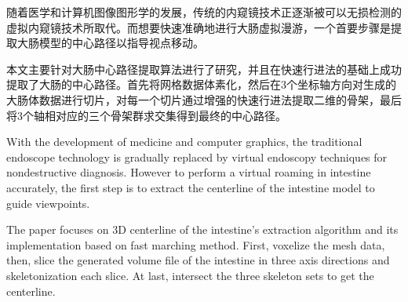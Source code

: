 \begin{cabstract}
随着医学和计算机图像图形学的发展，传统的内窥镜技术正逐渐被可以无损检测的虚拟内窥镜技术所取代。而想要快速准确地进行大肠虚拟漫游，一个首要步骤是提取大肠模型的中心路径以指导视点移动。

本文主要针对大肠中心路径提取算法进行了研究，并且在快速行进法的基础上成功提取了大肠的中心路径。首先将网格数据体素化，然后在3个坐标轴方向对生成的大肠体数据进行切片，对每一个切片通过增强的快速行进法提取二维的骨架，最后将3个轴相对应的三个骨架群求交集得到最终的中心路径。
\end{cabstract}

\begin{eabstract}
With the development of medicine and computer graphics, the traditional endoscope technology is gradually replaced by virtual endoscopy techniques for nondestructive diagnosis. However to perform a virtual roaming in intestine accurately, the first step is to extract the centerline of the intestine model to guide viewpoints.

The paper focuses on 3D centerline of the intestine's extraction algorithm and its implementation based on fast marching method. First, voxelize the mesh data, then, slice the generated volume file of the intestine in three axis directions and skeletonization each slice. At last, intersect the three skeleton sets to get the centerline.
\end{eabstract}
